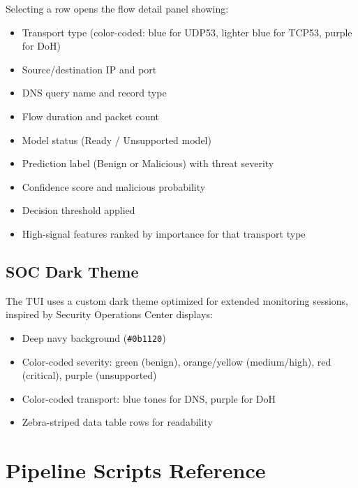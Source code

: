 \documentclass[12pt,a4paper]{article}
\begin{document}
Selecting a row opens the flow detail panel showing:
\begin{itemize}
    \item Transport type (color-coded: blue for UDP53, lighter blue for TCP53, purple for DoH)
    \item Source/destination IP and port
    \item DNS query name and record type
    \item Flow duration and packet count
    \item Model status (Ready / Unsupported model)
    \item Prediction label (Benign or Malicious) with threat severity
    \item Confidence score and malicious probability
    \item Decision threshold applied
    \item High-signal features ranked by importance for that transport type
\end{itemize}

\subsection{SOC Dark Theme}

The TUI uses a custom dark theme optimized for extended monitoring sessions, inspired by Security Operations Center displays:
\begin{itemize}
    \item Deep navy background (\texttt{\#0b1120})
    \item Color-coded severity: green (benign), orange/yellow (medium/high), red (critical), purple (unsupported)
    \item Color-coded transport: blue tones for DNS, purple for DoH
    \item Zebra-striped data table rows for readability
\end{itemize}

\section{Pipeline Scripts Reference}
\end{document}
